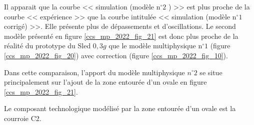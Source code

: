 Il apparait que la courbe << simulation (modèle $\mathrm{n}^{\circ} 2$ ) >> est plus proche de la courbe << expérience >> que la courbe intitulée << simulation (modèle $\mathrm{n}^{\circ} 1$ corrigé) >>. Elle présente plus de dépassements et d'oscillations. Le second modèle présenté en figure \ref{ccs_mp_2022_fig_21} est donc plus proche de la réalité du prototype du Sled $0,3 g$ que le modèle multiphysique $\mathrm{n}^{\circ} 1$ (figure \ref{ccs_mp_2022_fig_20}) avec correction (figure \ref{ccs_mp_2022_fig_10}).

Dans cette comparaison, l'apport du modèle multiphysique $n^{\circ} 2$ se situe principalement sur l'ajout de la zone entourée d'un ovale en figure \ref{ccs_mp_2022_fig_21}.
\fi


\ifprof
\begin{corrige}
Le composant technologique modélisé par la zone entourée d'un ovale est la courroie C2.
\end{corrige}
\else
\fi
